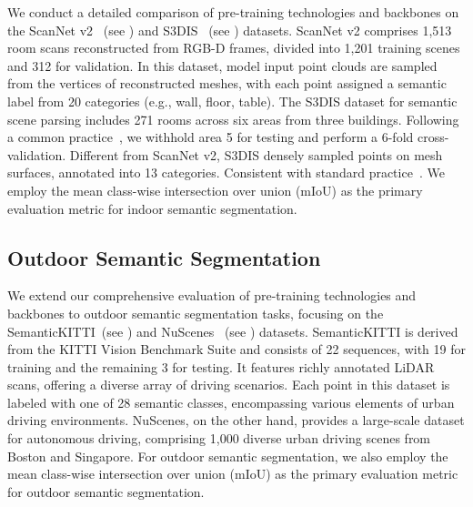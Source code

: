 We conduct a detailed comparison of pre-training technologies and backbones on the ScanNet v2~\cite{dai2017scannet} (see ) and S3DIS~\cite{armeni2016s3dis} (see ) datasets. ScanNet v2 comprises 1,513 room scans reconstructed from RGB-D frames, divided into 1,201 training scenes and 312 for validation. In this dataset, model input point clouds are sampled from the vertices of reconstructed meshes, with each point assigned a semantic label from 20 categories (e.g., wall, floor, table). The S3DIS dataset for semantic scene parsing includes 271 rooms across six areas from three buildings. Following a common practice~\cite{tchapmi2017segcloud,qi2017pointnet++,zhao2021point}, we withhold area 5 for testing and perform a 6-fold cross-validation. Different from ScanNet v2, S3DIS densely sampled points on mesh surfaces, annotated into 13 categories. Consistent with standard practice~\citep{qi2017pointnet++}. We employ the mean class-wise intersection over union (mIoU) as the primary evaluation metric for indoor semantic segmentation.

\begin{table}[!t]
    \begin{minipage}{0.48\textwidth}
    \centering
        
        \vspace{-3mm}
        \caption{\textbf{SemanticKITTI semantic segmentation.} }\label{tab:appendix_semantic_kitti}
        \vspace{2mm}
    \end{minipage}
    \begin{minipage}{0.48\textwidth}
    \centering
        
        \vspace{-3mm}
        \caption{\textbf{NuScenes semantic segmentation.} }\label{tab:appendix_nuscenes}
        \vspace{-6mm}
    \end{minipage}
\end{table}


\subsection{Outdoor Semantic Segmentation}
We extend our comprehensive evaluation of pre-training technologies and backbones to outdoor semantic segmentation tasks, focusing on the SemanticKITTI~\cite{behley2019semantickitti}(see ) and NuScenes~\cite{caesar2020nuscenes} (see ) datasets. SemanticKITTI is derived from the KITTI Vision Benchmark Suite and consists of 22 sequences, with 19 for training and the remaining 3 for testing. It features richly annotated LiDAR scans, offering a diverse array of driving scenarios. Each point in this dataset is labeled with one of 28 semantic classes, encompassing various elements of urban driving environments. NuScenes, on the other hand, provides a large-scale dataset for autonomous driving, comprising 1,000 diverse urban driving scenes from Boston and Singapore. For outdoor semantic segmentation, we also employ the mean class-wise intersection over union (mIoU) as the primary evaluation metric for outdoor semantic segmentation.
